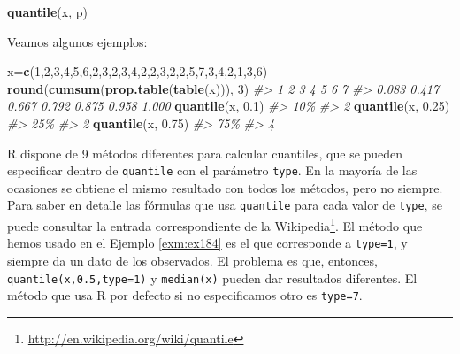 \documentclass[
]{book}
\newenvironment{Shaded}{\begin{snugshade}}{\end{snugshade}}
\newcommand{\CommentTok}[1]{\textcolor[rgb]{0.56,0.35,0.01}{\textit{#1}}}
\newcommand{\DecValTok}[1]{\textcolor[rgb]{0.00,0.00,0.81}{#1}}
\newcommand{\FloatTok}[1]{\textcolor[rgb]{0.00,0.00,0.81}{#1}}
\newcommand{\KeywordTok}[1]{\textcolor[rgb]{0.13,0.29,0.53}{\textbf{#1}}}
\newcommand{\NormalTok}[1]{#1}
\DeclareRobustCommand{\href}[2]{#2\footnote{\url{#1}}}
\theoremstyle{definition}
\theoremstyle{definition}
\theoremstyle{definition}
\theoremstyle{remark}
\begin{document}
\begin{Shaded}
\begin{Highlighting}[]
\KeywordTok{quantile}\NormalTok{(x, p)}
\end{Highlighting}
\end{Shaded}

Veamos algunos ejemplos:

\begin{Shaded}
\begin{Highlighting}[]
\NormalTok{x=}\KeywordTok{c}\NormalTok{(}\DecValTok{1}\NormalTok{,}\DecValTok{2}\NormalTok{,}\DecValTok{3}\NormalTok{,}\DecValTok{4}\NormalTok{,}\DecValTok{5}\NormalTok{,}\DecValTok{6}\NormalTok{,}\DecValTok{2}\NormalTok{,}\DecValTok{3}\NormalTok{,}\DecValTok{2}\NormalTok{,}\DecValTok{3}\NormalTok{,}\DecValTok{4}\NormalTok{,}\DecValTok{2}\NormalTok{,}\DecValTok{2}\NormalTok{,}\DecValTok{3}\NormalTok{,}\DecValTok{2}\NormalTok{,}\DecValTok{2}\NormalTok{,}\DecValTok{5}\NormalTok{,}\DecValTok{7}\NormalTok{,}\DecValTok{3}\NormalTok{,}\DecValTok{4}\NormalTok{,}\DecValTok{2}\NormalTok{,}\DecValTok{1}\NormalTok{,}\DecValTok{3}\NormalTok{,}\DecValTok{6}\NormalTok{)}
\KeywordTok{round}\NormalTok{(}\KeywordTok{cumsum}\NormalTok{(}\KeywordTok{prop.table}\NormalTok{(}\KeywordTok{table}\NormalTok{(x))), }\DecValTok{3}\NormalTok{)}
\CommentTok{\#\textgreater{}     1     2     3     4     5     6     7 }
\CommentTok{\#\textgreater{} 0.083 0.417 0.667 0.792 0.875 0.958 1.000}
\KeywordTok{quantile}\NormalTok{(x, }\FloatTok{0.1}\NormalTok{)}
\CommentTok{\#\textgreater{} 10\% }
\CommentTok{\#\textgreater{}   2}
\KeywordTok{quantile}\NormalTok{(x, }\FloatTok{0.25}\NormalTok{)}
\CommentTok{\#\textgreater{} 25\% }
\CommentTok{\#\textgreater{}   2}
\KeywordTok{quantile}\NormalTok{(x, }\FloatTok{0.75}\NormalTok{)}
\CommentTok{\#\textgreater{} 75\% }
\CommentTok{\#\textgreater{}   4}
\end{Highlighting}
\end{Shaded}

R dispone de 9 métodos diferentes para calcular cuantiles, que se pueden especificar dentro de \texttt{quantile} con el parámetro \texttt{type}. En la mayoría de las ocasiones se obtiene el mismo resultado con todos los métodos, pero no siempre. Para saber en detalle las fórmulas que usa \texttt{quantile} para cada valor de \texttt{type}, se puede consultar la \href{http://en.wikipedia.org/wiki/quantile}{entrada correspondiente de la Wikipedia}. El método que hemos usado en el Ejemplo \ref{exm:ex184} es el que corresponde a \texttt{type=1}, y siempre da un dato de los observados. El problema es que, entonces, \texttt{quantile(x,0.5,type=1)} y \texttt{median(x)} pueden dar resultados diferentes. El método que usa R por defecto si no especificamos otro es \texttt{type=7}.
\end{document}
